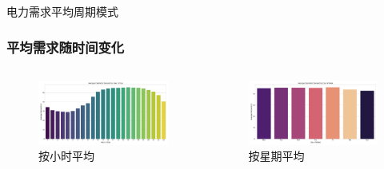 \documentclass{beamer} %
\begin{document}
\begin{frame}{电力需求平均周期模式}
    \frametitle{平均需求随时间变化}
    \begin{columns}[T,onlytextwidth]
        \begin{column}{0.48\textwidth}
             \centering
            \begin{figure}
                \includegraphics[width=\textwidth]{../plots/avg_demand_by_hour_spark.png}
                \caption{按小时平均}
            \end{figure}
        \end{column}
        \begin{column}{0.48\textwidth}
             \centering
            \begin{figure}
                \includegraphics[width=\textwidth]{../plots/avg_demand_by_dayofweek_spark.png}
                \caption{按星期平均}
            \end{figure}
        \end{column}
    \end{columns}
    \begin{figure}[H] %
        \centering

\end{figure}
\end{frame}
\end{document}

